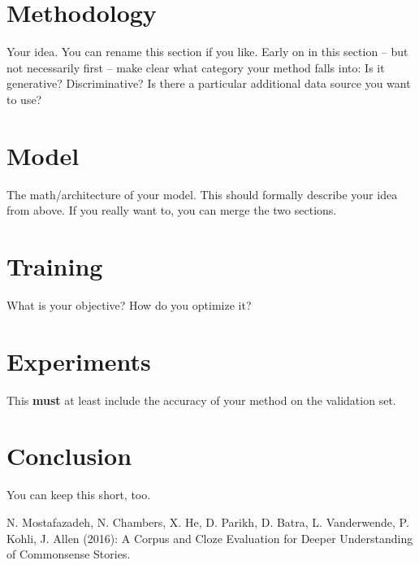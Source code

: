 \documentclass{article}
\begin{document}
\section{Methodology}
Your idea. You can rename this section if you like. Early on in this section -- but not necessarily first -- make clear what category your method falls into: Is it generative? Discriminative? Is there a particular additional data source you want to use?
\section{Model}
The math/architecture of your model. This should formally describe your idea from above. If you really want to, you can merge the two sections.
\section{Training}
What is your objective? How do you optimize it?

\section{Experiments}
This {\bf must} at least include the accuracy of your method on the validation set.
\section{Conclusion}
You can keep this short, too.

\pagebreak

\begin{thebibliography}{}
 
 N. Mostafazadeh, N. Chambers, X. He, D. Parikh, D. Batra, L. Vanderwende, P. Kohli, J. Allen (2016): A Corpus and Cloze Evaluation for Deeper Understanding of Commonsense Stories.


\end{thebibliography}
\end{document}
